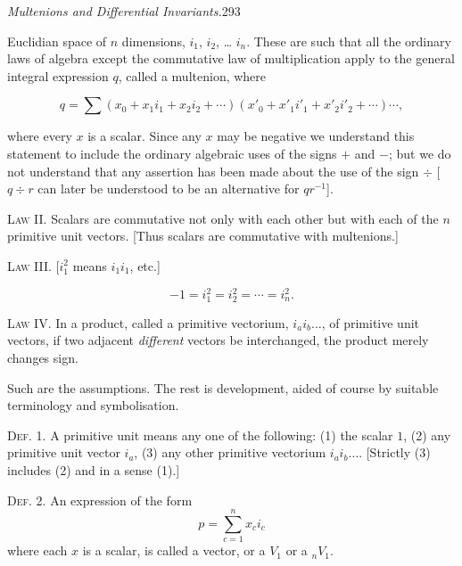 \documentclass[11pt]{article}
\begin{document}
\newpage\thispagestyle{empty}

\begin{center}
  \textit{Multenions and Differential Invariants.}\hfill 293
\end{center}

Euclidian space of $n$ dimensions, $i_1$, $i_2$, \ldots{} $i_n$. These are
such that all the ordinary laws of algebra except the commutative law of
multiplication apply to the general integral expression $q$, called a
multenion, where

\begin{equation}
q = \sum (x_0+x_1i_1+x_2i_2+\cdots)(x'_0+x'_1i'_1+x'_2i'_2+\cdots)\cdots,
\tag{1}
\end{equation}

where every $x$ is a scalar. Since any $x$ may be negative we understand this
statement to include the ordinary algebraic uses of the signs $+$ and $-$; but
we do not understand that any assertion has been made about the use of the sign
$\div$ [$q\div r$ can later be understood to be an alternative for $qr^{-1}$].

\noindent\textsc{Law II.} Scalars are commutative not only with each other but
with each of the $n$ primitive unit vectors. [Thus scalars are commutative with
multenions.]

\begin{center}
  \textsc{Law III.} [$i_1^2$ means $i_1i_1$, etc.]
\end{center}
\begin{equation*}
  -1=i_1^2=i_2^2=\cdots=i_n^2.
\end{equation*}

\noindent\textsc{Law IV.} In a product, called a primitive vectorium,
$i_ai_b\ldots$, of primitive unit vectors, if two adjacent \emph{different}
vectors be interchanged, the product merely changes sign.

\indent Such are the assumptions. The rest is development, aided of course by
suitable terminology and symbolisation.

\noindent\textsc{Def. 1.} A primitive unit means any one of the following:
(1) the scalar $1$, (2) any primitive unit vector $i_a$, (3) any other
primitive vectorium $i_ai_b\ldots$. [Strictly (3) includes (2) and in a sense
(1).]

\noindent\textsc{Def. 2.} An expression of the form
\begin{equation*}
  p=\sum_{c=1}^{n}x_ci_c
\end{equation*}
where each $x$ is a scalar, is called a vector, or a $V_1$ or a ${}_nV_1$.
\end{document}

